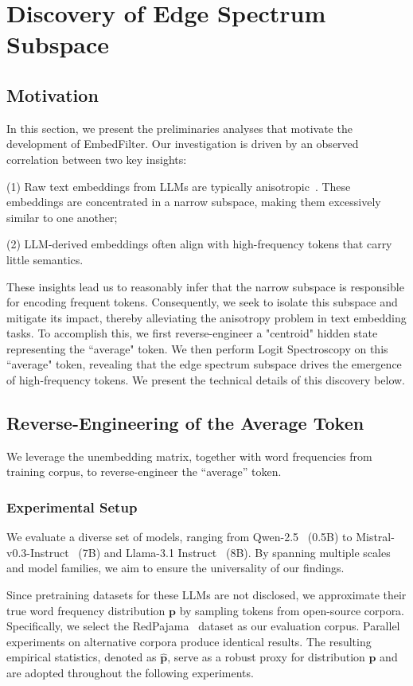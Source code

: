 \documentclass{llmxive}
\providecommand{\bm}[1]{\boldsymbol{#1}}
\providecommand{\name}{EmbedFilter}
\providecommand{\vp}{{\bm{p}}}
\begin{document}
\section{Discovery of Edge Spectrum Subspace}
\label{sec:interpret}

\subsection{Motivation}
In this section, we present the preliminaries analyses that motivate the development of \name.
Our investigation is driven by an observed correlation between two key insights:

(1) Raw text embeddings from LLMs are typically anisotropic~\cite{bertflow,whitening}. 
These embeddings are concentrated in a narrow subspace, making them excessively similar to one another; 

(2) LLM-derived embeddings often align with high-frequency tokens that carry little semantics.

These insights lead us to reasonably infer that the narrow subspace is responsible for encoding frequent tokens. 
Consequently, we seek to isolate this subspace and mitigate its impact, thereby alleviating the anisotropy problem in text embedding tasks.
To accomplish this, we first reverse-engineer a "centroid" hidden state representing the “average" token. 
We then perform Logit Spectroscopy on this “average" token, revealing that the edge spectrum subspace drives the emergence of high-frequency tokens. 
We present the technical details of this discovery below.

\subsection{Reverse-Engineering of the Average Token}
We leverage the unembedding matrix, together with word frequencies from training corpus, to reverse-engineer the “average” token.

\subsubsection{Experimental Setup}
We evaluate a diverse set of models, ranging from Qwen-2.5~\cite{qwen2.5} (0.5B) to Mistral-v0.3-Instruct~\cite{mistral7b} (7B) and Llama-3.1 Instruct~\cite{llama3} (8B). By spanning multiple scales and model families, we aim to ensure the universality of our findings.

Since pretraining datasets for these LLMs are not disclosed, we approximate their true word frequency distribution $\vp$ by sampling tokens from open-source corpora. 
Specifically, we select the RedPajama~\cite{redpajama} dataset as our evaluation corpus.
Parallel experiments on alternative corpora produce identical results.
The resulting empirical statistics, denoted as $\hat{\vp}$, serve as a robust proxy for distribution $\vp$ and are adopted throughout the following experiments.
\end{document}
